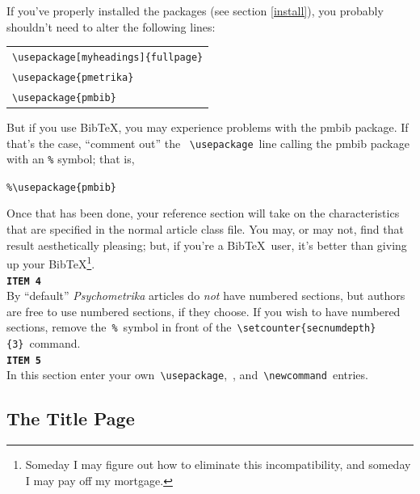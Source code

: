 \documentclass[titlepage,12pt]{article}
\begin{document}
If you've properly installed the packages (see section
\ref{install}), you probably shouldn't need to alter the following
lines:

{}
\begin{center}
\begin{tabular}{l}
\verb=\usepackage[myheadings]{fullpage}=  \\
\verb=\usepackage{pmetrika}=  \\
\verb=\usepackage{pmbib}=  \\[1.75ex]
\end{tabular}
\end{center}
{}

\noindent But if you use Bib\TeX, you may experience problems with
the pmbib package. If that's the case, ``comment out'' the~
\verb=\usepackage=~line calling the pmbib package with an \verb=%= symbol;
that is,

\begin{center}\verb=%\usepackage{pmbib}=\end{center}

\noindent Once that has been done, your reference section will
take on the characteristics that are specified in the normal
article class file. You may, or may not, find that result
aesthetically pleasing; but, if you're a Bib\TeX\ user, it's
better than giving
up your Bib\TeX\footnote{Someday I may figure out how to eliminate this incompatibility, and someday I may pay off my mortgage.}.\\[1.5ex]

\noindent\texttt{\bf ITEM 4}\\[1.5ex]

By ``default'' \textit{Psychometrika} articles do \textit{not}
have numbered sections, but authors are free to use numbered
sections, if they choose. If you wish to have numbered sections,
remove the~\verb=%=~symbol in front of the~\verb=\setcounter{secnumdepth}{3}=~command.\\[1.5ex]

\noindent\texttt{\bf ITEM 5}\\[1.5ex]

In this section enter your own~\verb=\usepackage=,~\verb==,
and~\verb=\newcommand=~entries.

\subsection{The Title Page}\label{titlepage}
\end{document}
